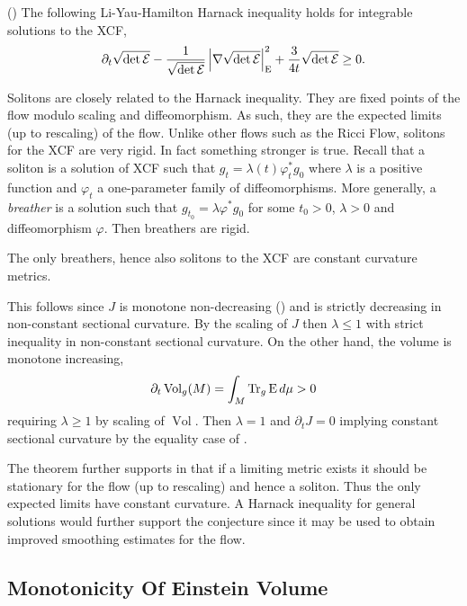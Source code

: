 \documentclass[a4paper,12pt]{amsart}
\begin{document}
\begin{thm}(\cite[Section 6]{BIS4})
\label{thm:harnack}
The following Li-Yau-Hamilton Harnack inequality holds for integrable solutions to the XCF,
\[
\partial_t \sqrt{\det\operatorname{\mathcal{E}}} - \frac{1}{\sqrt{\det\operatorname{\mathcal{E}}}} \left\lvert{\nabla \sqrt{\det\operatorname{\mathcal{E}}}}\right\rvert_{\operatorname{E}}^2 + \frac{3}{4t}\sqrt{\det\operatorname{\mathcal{E}}} \geq 0.
\]
\end{thm}

Solitons are closely related to the Harnack inequality. They are fixed points of the flow modulo scaling and diffeomorphism. As such, they are the expected limits (up to rescaling) of the flow. Unlike other flows such as the Ricci Flow, solitons for the XCF are very rigid. In fact something stronger is true. Recall that a soliton is a solution of XCF such that \(g_t = \lambda(t) \varphi_t^{\ast} g_0\) where \(\lambda\) is a positive function and \(\varphi_t\) a one-parameter family of diffeomorphisms. More generally, a \emph{breather} is a solution such that \(g_{t_0} = \lambda \varphi^{\ast} g_0\) for some \(t_0 > 0\), \(\lambda > 0\) and diffeomorphism \(\varphi\). Then breathers are rigid.

\begin{thm}[{\cite{MR2302600}}]
The only breathers, hence also solitons to the XCF are constant curvature metrics.
\end{thm}

 This follows since $J$ is monotone non-decreasing () and is strictly decreasing in non-constant sectional curvature. By the scaling of \(J\) then \(\lambda \leq 1\) with strict inequality in non-constant sectional curvature. On the other hand, the volume is monotone increasing,
\[
\partial_t \operatorname{Vol}_g (M) = \int_M \operatorname{Tr}_g \operatorname{E} d\mu > 0
\]
requiring \(\lambda \geq 1\) by scaling of \(\operatorname{Vol}\). Then \(\lambda = 1\) and \(\partial_t J = 0\) implying constant sectional curvature by the equality case of .

The theorem further supports  in that if a limiting metric exists it should be stationary for the flow (up to rescaling) and hence a soliton. Thus the only expected limits have constant curvature. A Harnack inequality for general solutions would further support the conjecture since it may be used to obtain improved smoothing estimates for the flow.

\subsection{Monotonicity Of Einstein Volume}
\label{subsec:xcf_volume}
\end{document}
